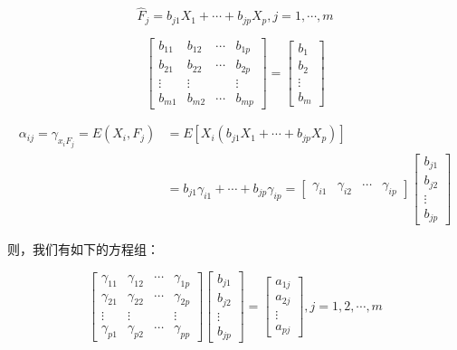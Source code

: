 \documentclass[]{ctexbook}
\begin{document}
\[\hat F_j=b_{j1}X_1+\cdots+b_{jp}X_p, j=1,\cdots,m\]

\[\begin {bmatrix}b_{11}&b_{12}&\cdots&b_{1p}\\b_{21}&b_{22}&\cdots&b_{2p}\\\vdots&\vdots&&\vdots\\b_{m1}&b_{m2}&\cdots&b_{mp} \end {bmatrix}=\begin {bmatrix}b_1\\b_2\\\vdots\\b_m \end {bmatrix}\]

\[\begin {aligned} \alpha_{ij}=\gamma_{x_iF_j}=E(X_i,F_j)&=E[X_i(b_{j1}X_1+\cdots+b_{jp}X_p)]\\&=b_{j1}\gamma_{i1}+\cdots+b_{jp}\gamma_{ip}=\begin {bmatrix}\gamma_{i1}&\gamma_{i2}&\cdots&\gamma_{ip} \end {bmatrix}\begin {bmatrix}b_{j1}\\b_{j2}\\\vdots\\b_{jp} \end {bmatrix} \end {aligned}\]

则，我们有如下的方程组：

\[\begin {bmatrix}\gamma_{11}&\gamma_{12}&\cdots&\gamma_{1p}\\\gamma_{21}&\gamma_{22}&\cdots&\gamma_{2p}\\\vdots&\vdots&&\vdots\\\gamma_{p1}&\gamma_{p2}&\cdots&\gamma_{pp} \end {bmatrix}\begin {bmatrix}b_{j1}\\b_{j2}\\\vdots\\b_{jp} \end {bmatrix}=\begin {bmatrix}a_{1j}\\a_{2j}\\\vdots\\a_{pj} \end {bmatrix},j=1,2,\cdots,m\]
\end{document}
